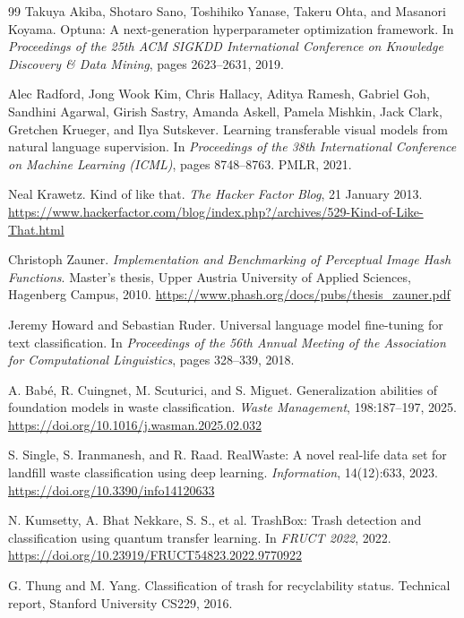 \documentclass[11pt,a4paper]{article}
\begin{document}
\begin{thebibliography}{99}
		Takuya Akiba, Shotaro Sano, Toshihiko Yanase, Takeru Ohta, and Masanori Koyama.
		Optuna: A next-generation hyperparameter optimization framework.
		In \textit{Proceedings of the 25th ACM SIGKDD International Conference on Knowledge Discovery \& Data Mining}, pages 2623--2631, 2019.
		
		Alec Radford, Jong Wook Kim, Chris Hallacy, Aditya Ramesh, Gabriel Goh, Sandhini Agarwal, Girish Sastry, Amanda Askell, Pamela Mishkin, Jack Clark, Gretchen Krueger, and Ilya Sutskever.
		Learning transferable visual models from natural language supervision.
		In \textit{Proceedings of the 38th International Conference on Machine Learning (ICML)}, pages 8748--8763. PMLR, 2021.
		
		Neal Krawetz.
		Kind of like that.
		\textit{The Hacker Factor Blog}, 21 January 2013.
		\url{https://www.hackerfactor.com/blog/index.php?/archives/529-Kind-of-Like-That.html}
		
		Christoph Zauner.
		\textit{Implementation and Benchmarking of Perceptual Image Hash Functions}.
		Master's thesis, Upper Austria University of Applied Sciences, Hagenberg Campus, 2010.
		\url{https://www.phash.org/docs/pubs/thesis_zauner.pdf}
		
		Jeremy Howard and Sebastian Ruder.
		Universal language model fine-tuning for text classification.
		In \textit{Proceedings of the 56th Annual Meeting of the Association for Computational Linguistics}, pages 328--339, 2018.
		
		A. Babé, R. Cuingnet, M. Scuturici, and S. Miguet.
		Generalization abilities of foundation models in waste classification.
		\textit{Waste Management}, 198:187--197, 2025.
		\url{https://doi.org/10.1016/j.wasman.2025.02.032}
		
		S. Single, S. Iranmanesh, and R. Raad.
		RealWaste: A novel real-life data set for landfill waste classification using deep learning.
		\textit{Information}, 14(12):633, 2023.
		\url{https://doi.org/10.3390/info14120633}
		
		N. Kumsetty, A. Bhat Nekkare, S. S., et al.
		TrashBox: Trash detection and classification using quantum transfer learning.
		In \textit{FRUCT 2022}, 2022.
		\url{https://doi.org/10.23919/FRUCT54823.2022.9770922}
		
		G. Thung and M. Yang.
		Classification of trash for recyclability status.
		Technical report, Stanford University CS229, 2016.
		

\end{thebibliography}
\end{document}
